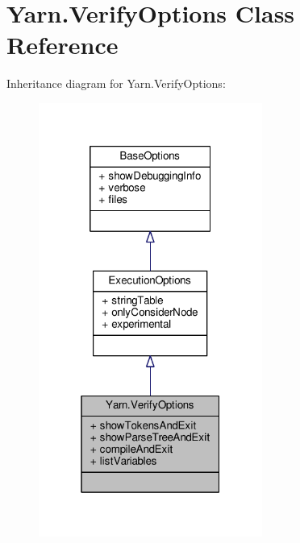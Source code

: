 \hypertarget{a00192}{\section{Yarn.\-Verify\-Options Class Reference}
\label{a00192}
}


Inheritance diagram for Yarn.\-Verify\-Options\-:
\nopagebreak
\begin{figure}[H]
\begin{center}
\leavevmode
\includegraphics[width=208pt]{a00738}
\end{center}
\end{figure}


